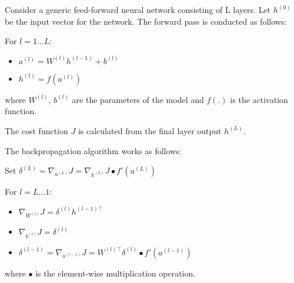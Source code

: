 \documentclass[11pt,letterpaper]{article}
\newcommand{\up}[1]{^{(#1)}}
\begin{document}
Consider a generic feed-forward neural network consisting of L layers. Let $h\up{0}$ be the input vector for the network. The forward pass is conducted as follows:

For $l = 1 \dots L$:
\begin{itemize}
\item $a\up{l} = W\up{l}h\up{l - 1} + b\up{l}$ 
\item $h\up{l} = f(a\up{l})$
\end{itemize} where $W\up{l}$, $b\up{l}$ are the parameters of the model and $f(.)$ is the activation function.

The cost function $J$ is calculated from the final layer output $h\up{L}$. 

The backpropagation algorithm works as follows:

Set $\delta\up{L} = \nabla_{a\up{L}} J = \nabla_{h\up{L}} J \bullet f'(a\up{L}) $

For $l = L \dots 1$:
\begin{itemize}
  \item $\nabla_{W\up{l}} J = \delta\up{l} h^{(l - 1)\top} $
  \item $\nabla_{b\up{l}} J = \delta\up{l}$
  \item $\delta\up{l - 1} = \nabla_{a\up{l - 1}} J =  W^{(l)\top} \delta\up{l} \bullet f'(a\up{l - 1})$
\end{itemize} where $\bullet$ is the element-wise multiplication operation.
\end{document}
